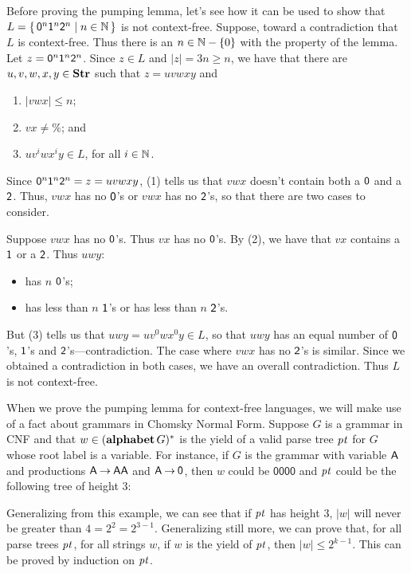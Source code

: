 Before proving the pumping lemma, let's see how it can be used to show
that $L=\{ \, \mathsf{0}^n\mathsf{1}^n\mathsf{2}^n \mid n\in\mathbb{N} \, \}$ is not
context-free.  Suppose, toward a contradiction that $L$ is
context-free.  Thus there is an $n\in\mathbb{N}-\{0\}$ with the property of the
lemma.  Let $z={\mathsf{0}^n\mathsf{1}^n\mathsf{2}^n}$.
Since $z\in L$ and $|z|=3n\geq n$, we have that there are
$u,v,w,x,y\in\mathbf{Str}$ such that $z=uvwxy$ and
\begin{enumerate}[\quad(1)]
\item $|vwx|\leq n$;

\item $vx\neq\%$; and

\item $uv^iwx^iy\in L$, for all $i\in\mathbb{N}$.
\end{enumerate}
Since $\mathsf{0}^n\mathsf{1}^n\mathsf{2}^n=z=uvwxy$, (1) tells us that
$vwx$ doesn't contain both a $\mathsf{0}$ and a $\mathsf{2}$.
Thus, $vwx$ has no $\mathsf{0}$'s or $vwx$ has no $\mathsf{2}$'s, so that
there are two cases to consider.

Suppose $vwx$ has no $\mathsf{0}$'s.  Thus $vx$ has no $\mathsf{0}$'s.
By (2), we have that $vx$ contains a $\mathsf{1}$ or a $\mathsf{2}$.
Thus $uwy$:
\begin{itemize}
\item has $n$ $\mathsf{0}$'s;

\item has less than $n$ $\mathsf{1}$'s or has less than $n$ $\mathsf{2}$'s.
\end{itemize}
But (3) tells us that $uwy=uv^0wx^0y\in L$, so that $uwy$ has an equal
number of $\mathsf{0}$'s, $\mathsf{1}$'s and $\mathsf{2}$'s---contradiction.
The case where $vwx$ has no $\mathsf{2}$'s is similar.
Since we obtained a contradiction in both cases, we have an overall
contradiction.  Thus $L$ is not context-free.

When we prove the pumping lemma for context-free languages, we will
make use of a fact about grammars in Chomsky Normal Form.
Suppose $G$ is a grammar in CNF and that $w\in(\mathbf{alphabet}\,G)^*$
is the yield of a valid parse tree ${\it pt}$ for $G$ whose root label
is a variable.
For instance, if $G$ is the grammar with variable $\mathsf{A}$ and
productions $\mathsf{A}\mathbin{\to}\mathsf{A}\mathsf{A}$ and $\mathsf{A}\mathbin{\to}\mathsf{0}$, then
$w$ could be $\mathsf{0000}$ and ${\it pt}$ could be the following
tree of height $3$:
\begin{center}

\end{center}

Generalizing from this example, we can see that if ${\it pt}$ has height
$3$, $|w|$ will never be greater than $4=2^2=2^{3-1}$.  Generalizing
still more, we can prove that, for all parse trees ${\it pt}$, for all
strings $w$, if $w$ is the yield of ${\it pt}$, then $|w|\leq { 2^{k-1}}$.
This can be proved by induction on ${\it pt}$.

